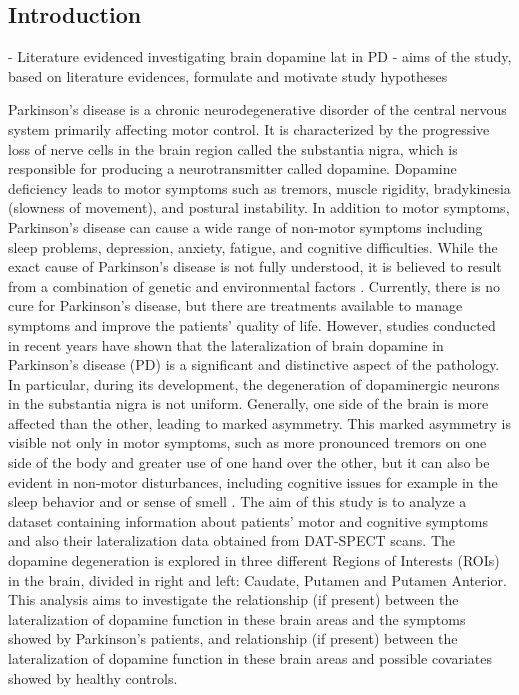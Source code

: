 \documentclass[]{article}
\begin{document}
\begin{multicols}{2}
\section{Introduction}

- Literature evidenced investigating brain dopamine lat in PD
- aims of the study, based on literature evidences, 
formulate and motivate study hypotheses


Parkinson's disease is a chronic neurodegenerative disorder of the central nervous system primarily affecting motor control. It is characterized by the progressive loss of nerve cells in the brain region called the substantia nigra, which is responsible for producing a neurotransmitter called dopamine. Dopamine deficiency leads to motor symptoms such as tremors, muscle rigidity, bradykinesia (slowness of movement), and postural instability. In addition to motor symptoms, Parkinson's disease can cause a wide range of non-motor symptoms including sleep problems, depression, anxiety, fatigue, and cognitive difficulties. While the exact cause of Parkinson's disease is not fully understood, it is believed to result from a combination of genetic and environmental factors \cite{beitz_parkinsons_2014}. Currently, there is no cure for Parkinson's disease, but there are treatments available to manage symptoms and improve the patients’ quality of life.  However, studies conducted in recent years have shown that the lateralization of brain dopamine in Parkinson's disease (PD) is a significant and distinctive aspect of the pathology. In particular, during its development, the degeneration of dopaminergic neurons in the substantia nigra is not uniform. Generally, one side of the brain is more affected than the other, leading to marked asymmetry. This marked asymmetry is visible not only in motor symptoms, such as more pronounced tremors on one side of the body and greater use of one hand over the other, but it can also be evident in non-motor disturbances, including cognitive issues for example in the sleep behavior and or sense of smell \cite{riederer_lateralisation_2018}. 
\newline
The aim of this study is to analyze a dataset containing information about patients' motor and cognitive symptoms and also their lateralization data obtained from DAT-SPECT scans. The dopamine degeneration is explored in three different Regions of Interests (ROIs) in the brain, divided in right and left: Caudate, Putamen and Putamen Anterior. This analysis aims to investigate the relationship (if present) between the lateralization of dopamine function in these brain areas and the symptoms showed by Parkinson's patients, and relationship (if present) between the lateralization of dopamine function in these brain areas and possible covariates showed by healthy controls.

\end{multicols}
\end{document}
